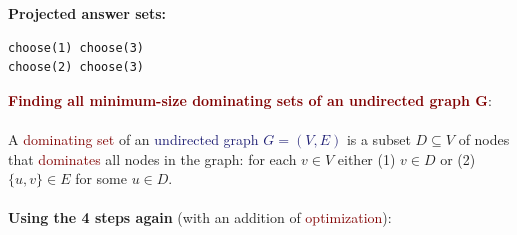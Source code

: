 \vspace{0.25cm}

\textbf{Projected answer sets:}
\begin{lstlisting}
choose(1) choose(3)
choose(2) choose(3)
\end{lstlisting}

\newpage


{\Large \textbf{\textcolor{Maroon}{Finding all minimum-size dominating sets of an undirected graph G}}}: \\
\\
A \textcolor{Maroon}{dominating set} of an \textcolor{MidnightBlue}{undirected graph $G = (V,E)$} is a subset $D \subseteq V$ of nodes that \textcolor{Maroon}{dominates} all nodes in the graph: for each $v \in V$ either (1) $v \in D$ or (2) $\{u,v\} \in E$ for some $u \in D$. \\
\\
\textbf{Using the 4 steps again} (with an addition of \textcolor{Maroon}{optimization}): 
